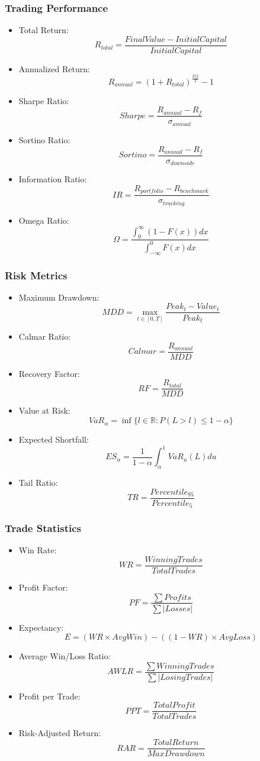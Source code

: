 \documentclass[conference]{IEEEtran}
\begin{document}
\subsubsection{Trading Performance}
\begin{itemize}
    \item Total Return: \[ R_{total} = \frac{FinalValue - InitialCapital}{InitialCapital} \]
    \item Annualized Return: \[ R_{annual} = (1 + R_{total})^{\frac{252}{T}} - 1 \]
    \item Sharpe Ratio: \[ Sharpe = \frac{R_{annual} - R_f}{\sigma_{annual}} \]
    \item Sortino Ratio: \[ Sortino = \frac{R_{annual} - R_f}{\sigma_{downside}} \]
    \item Information Ratio: \[ IR = \frac{R_{portfolio} - R_{benchmark}}{\sigma_{tracking}} \]
    \item Omega Ratio: \[ \Omega = \frac{\int_0^\infty (1-F(x))dx}{\int_{-\infty}^0 F(x)dx} \]
\end{itemize}

\subsubsection{Risk Metrics}
\begin{itemize}
    \item Maximum Drawdown: \[ MDD = \max_{t \in [0,T]} \frac{Peak_t - Value_t}{Peak_t} \]
    \item Calmar Ratio: \[ Calmar = \frac{R_{annual}}{MDD} \]
    \item Recovery Factor: \[ RF = \frac{R_{total}}{MDD} \]
    \item Value at Risk: \[ VaR_\alpha = \inf\{l \in \mathbb{R}: P(L > l) \leq 1-\alpha\} \]
    \item Expected Shortfall: \[ ES_\alpha = \frac{1}{1-\alpha} \int_\alpha^1 VaR_u(L)du \]
    \item Tail Ratio: \[ TR = \frac{Percentile_{95}}{Percentile_{5}} \]
\end{itemize}

\subsubsection{Trade Statistics}
\begin{itemize}
    \item Win Rate: \[ WR = \frac{WinningTrades}{TotalTrades} \]
    \item Profit Factor: \[ PF = \frac{\sum Profits}{\sum |Losses|} \]
    \item Expectancy: \[ E = (WR \times AvgWin) - ((1-WR) \times AvgLoss) \]
    \item Average Win/Loss Ratio: \[ AWLR = \frac{\sum WinningTrades}{\sum |LosingTrades|} \]
    \item Profit per Trade: \[ PPT = \frac{TotalProfit}{TotalTrades} \]
    \item Risk-Adjusted Return: \[ RAR = \frac{TotalReturn}{MaxDrawdown} \]
\end{itemize}
\end{document}
